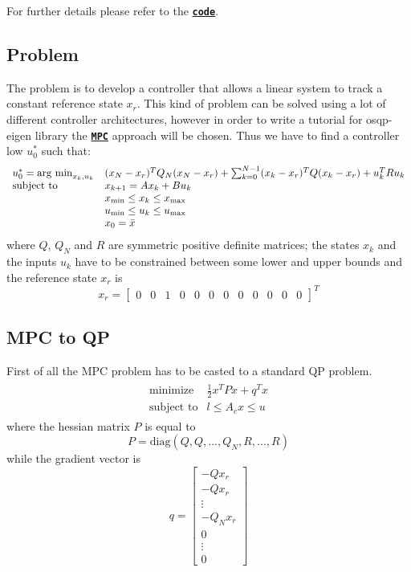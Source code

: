 For further details please refer to the \href{https://github.com/GiulioRomualdi/osqp-eigen/blob/master/example/src/MPCExample.cpp}{\tt {\bfseries code}}.\hypertarget{index_MPCPROBLEM}{}\subsection{Problem}\label{index_MPCPROBLEM}
The problem is to develop a controller that allows a linear system to track a constant reference state $x_r$. This kind of problem can be solved using a lot of different controller architectures, however in order to write a tutorial for osqp-\/eigen library the \href{https://en.wikipedia.org/wiki/Model_predictive_control}{\tt {\bfseries M\+PC}} approach will be chosen. Thus we have to find a controller low $u_0^*$ such that\+: \[ \begin{split}\begin{array}{ll} u_0 ^* = \mbox{arg min}_{x_k, u_k} & (x_N-x_r)^T Q_N (x_N-x_r) + \sum_{k=0}^{N-1} (x_k-x_r)^T Q (x_k-x_r) + u_k^T R u_k \\ \mbox{subject to} & x_{k+1} = A x_k + B u_k \\ & x_{\rm min} \le x_k \le x_{\rm max} \\ & u_{\rm min} \le u_k \le u_{\rm max} \\ & x_0 = \bar{x} \end{array}\end{split} \] where $Q$, $Q_N$ and $R$ are symmetric positive definite matrices; the states $x_k$ and the inputs $u_k$ have to be constrained between some lower and upper bounds and the reference state $x_r$ is \[ x_r = \begin{bmatrix} 0 & 0 & 1 & 0 & 0 & 0 & 0 & 0 & 0 & 0 & 0 & 0 \end{bmatrix} ^T \]\hypertarget{index_MPC2QP}{}\subsection{M\+P\+C to QP}\label{index_MPC2QP}
First of all the M\+PC problem has to be casted to a standard QP problem. \[ \begin{split}\begin{array}{ll} \mbox{minimize} & \frac{1}{2} x^T P x + q^T x \\ \mbox{subject to} & l \leq A_c x \leq u \end{array}\end{split} \] where the hessian matrix $P$ is equal to \[ P = \text{diag}(Q, Q, ..., Q_N, R, ..., R) \] while the gradient vector is \[ q = \begin{bmatrix} -Q x_r \\ -Q x_r \\ \vdots \\ -Q_N x_r \\ 0\\ \vdots\\ 0 \end{bmatrix} \]

